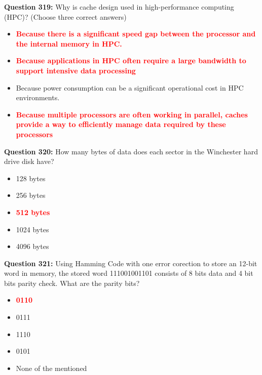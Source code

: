 \documentclass[12pt,a4paper]{article}
\begin{document}
\vspace{0.5cm}

\textbf{Question 319:} Why is cache design used in high-performance computing (HPC)? (Choose three correct answers)

\begin{itemize}
    \item[\textbf{A.}] \textcolor{red}{\textbf{Because there is a significant speed gap between the processor and the internal memory in HPC.}}
    \item[\textbf{B.}] \textcolor{red}{\textbf{Because applications in HPC often require a large bandwidth to support intensive data processing}}
    \item[\textbf{C.}] Because power consumption can be a significant operational cost in HPC environments.
    \item[\textbf{D.}] \textcolor{red}{\textbf{Because multiple processors are often working in parallel, caches provide a way to efficiently manage data required by these processors}}
\end{itemize}

\vspace{0.5cm}

\textbf{Question 320:} How many bytes of data does each sector in the Winchester hard drive disk have?

\begin{itemize}
    \item[\textbf{A.}] 128 bytes
    \item[\textbf{B.}] 256 bytes
    \item[\textbf{C.}] \textcolor{red}{\textbf{512 bytes}}
    \item[\textbf{D.}] 1024 bytes
    \item[\textbf{E.}] 4096 bytes
\end{itemize}

\vspace{0.5cm}

\textbf{Question 321:} Using Hamming Code with one error corection to store an 12-bit word in memory, the stored word 111001001101 consists of 8 bits data and 4 bit bits parity check. What are the parity bits?

\begin{itemize}
    \item[\textbf{A.}] \textcolor{red}{\textbf{0110}}
    \item[\textbf{B.}] 0111
    \item[\textbf{C.}] 1110
    \item[\textbf{D.}] 0101
    \item[\textbf{E.}] None of the mentioned
\end{itemize}
\end{document}
